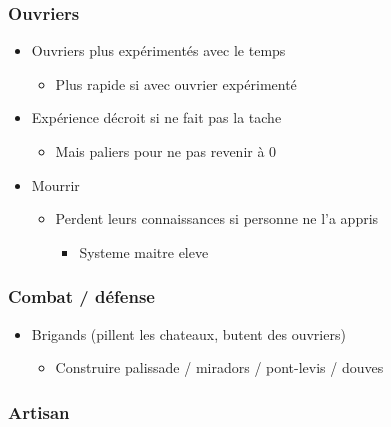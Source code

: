 \documentclass[
]{article}
\providecommand{\tightlist}{%
  \setlength{\itemsep}{0pt}\setlength{\parskip}{0pt}}
\begin{document}
\hypertarget{ouvriers}{%
\subsubsection{Ouvriers}\label{ouvriers}}

\begin{itemize}
\tightlist
\item
  Ouvriers plus expérimentés avec le temps

  \begin{itemize}
  \tightlist
  \item
    Plus rapide si avec ouvrier expérimenté
  \end{itemize}
\item
  Expérience décroit si ne fait pas la tache

  \begin{itemize}
  \tightlist
  \item
    Mais paliers pour ne pas revenir à 0
  \end{itemize}
\item
  Mourrir

  \begin{itemize}
  \tightlist
  \item
    Perdent leurs connaissances si personne ne l'a appris

    \begin{itemize}
    \tightlist
    \item
      Systeme maitre eleve
    \end{itemize}
  \end{itemize}
\end{itemize}

\hypertarget{combat--duxe9fense}{%
\subsubsection{Combat / défense}\label{combat--duxe9fense}}

\begin{itemize}
\tightlist
\item
  Brigands (pillent les chateaux, butent des ouvriers)

  \begin{itemize}
  \tightlist
  \item
    Construire palissade / miradors / pont-levis / douves
  \end{itemize}
\end{itemize}

\hypertarget{artisan}{%
\subsubsection{Artisan}\label{artisan}}
\end{document}
